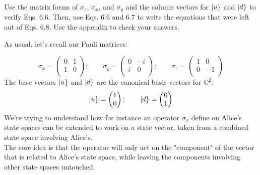\documentclass[solutions.tex]{subfiles}
\begin{document}
\maketitle
\begin{exercise} Use the matrix forms of $\sigma_z$, $\sigma_x$,
and $\sigma_y$ and the column vectors for $|u\}$ and $|d\}$
to verify Eqs. $6.6$. Then, use Eqs. $6.6$ and $6.7$ to write the
equations that were left out of Eqs. $6.8$. Use the appendix to
check your answers.
\end{exercise}
As usual, let's recall our Pauli matrices:

\[
	\sigma_x = \begin{pmatrix}
		0 & 1 \\
		1 & 0 \\
	\end{pmatrix};\qquad \sigma_y = \begin{pmatrix}
		0 & -i \\
		i & 0 \\
	\end{pmatrix};\qquad \sigma_z = \begin{pmatrix}
		1 & 0 \\
		0 & -1 \\
	\end{pmatrix}
\]
The base vectors $|u\}$ and $|d\}$ are the canonical
basis vectors for $\mathbb{C}^2$:
\[
	|u\} = \begin{pmatrix} 1 \\ 0 \\ \end{pmatrix};\qquad
	|d\} = \begin{pmatrix} 0 \\ 1 \\ \end{pmatrix}
\]
We're trying to understand how for instance an operator $\sigma_x$
define on Alice's state spaces can be extended to work on a state
vector, taken from a combined state space involving Alice's. \\

The core idea is that the operator will only act on the "component"
of the vector that is related to Alice's state space, while leaving
the components involving other state spaces untouched. \\
\end{document}

